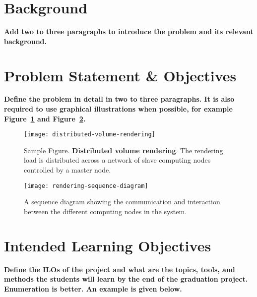 \documentclass[12pt]{article} 				%
\begin{document}
\newpage


\clearpage

\normalfont 

\section{Background} \label{section:background}
\textbf{Add two to three paragraphs to introduce the problem and its relevant background.}

\section{Problem Statement \& Objectives} \label{section:problem-statement}
\textbf{Define the problem in detail in two to three paragraphs. It is also required to use graphical illustrations when possible, for example Figure~\ref{figure:distributed-volume-rendering} and Figure~\ref{figure:rendering-sequence-diagram}. }

\begin{figure}[h!]
\centering 
\texttt{[image: distributed-volume-rendering]}
\caption{Sample Figure. \textbf{Distributed volume rendering}. The rendering load is distributed across a network of slave computing nodes controlled by a master node.}
\label{figure:distributed-volume-rendering}
\end{figure}

\begin{figure}[h!]
\centering 
\texttt{[image: rendering-sequence-diagram]}
\caption{A sequence diagram showing the communication and interaction between the different computing nodes in the system.}
\label{figure:rendering-sequence-diagram}
\end{figure}

\section{Intended Learning Objectives} \label{section:objectives}
\textbf{Define the ILOs of the project and what are the topics, tools, and methods the students will learn by the end of the graduation project. Enumeration is better. An example is given below.}
\end{document}
